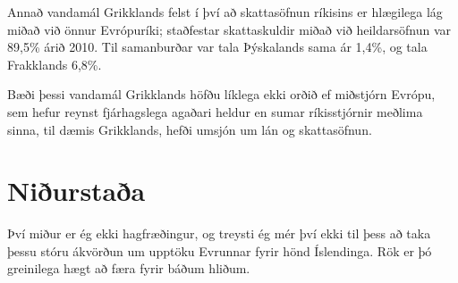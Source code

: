 \documentclass[a4paper]{article}
\begin{document}
Annað vandamál Grikklands felst í því að skattasöfnun ríkisins er hlægilega lág miðað við önnur Evrópuríki; staðfestar skattaskuldir miðað við heildarsöfnun var 89,5\% árið 2010. Til samanburðar var tala Þýskalands sama ár 1,4\%, og tala Frakklands 6,8\%.\cite{oecd_greece_taxes}

Bæði þessi vandamál Grikklands höfðu líklega ekki orðið ef miðstjórn Evrópu, sem hefur reynst fjárhagslega agaðari heldur en sumar ríkisstjórnir meðlima sinna, til dæmis Grikklands, hefði umsjón um lán og skattasöfnun.

\section{Niðurstaða}

Því miður er ég ekki hagfræðingur, og treysti ég mér því ekki til þess að taka þessu stóru ákvörðun um upptöku Evrunnar fyrir hönd Íslendinga. Rök er þó greinilega hægt að færa fyrir báðum hliðum.

\newpage


\end{document}
